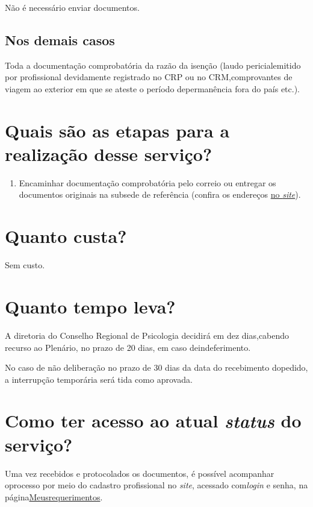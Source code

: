 Não é necessário enviar documentos.

\subsection{Nos demais casos}

Toda a documentação comprobatória da razão da isenção (laudo pericialemitido por profissional devidamente registrado no CRP ou no CRM,comprovantes de viagem ao exterior em que se ateste o período depermanência fora do país etc.).

\section{Quais são as etapas para a realização desse serviço?}

\begin{enumerate}
  \item  Encaminhar documentação comprobatória pelo correio ou entregar os  documentos originais na subsede de referência (confira os endereços  \href{https://www.crpsp.org/sede/index}{no \emph{site}}).
\end{enumerate}

\section{Quanto custa?}

Sem custo.

\section{Quanto tempo leva?}

A diretoria do Conselho Regional de Psicologia decidirá em dez dias,cabendo recurso ao Plenário, no prazo de 20 dias, em caso deindeferimento.

No caso de não deliberação no prazo de 30 dias da data do recebimento dopedido, a interrupção temporária será tida como aprovada.

\section{Como ter acesso ao atual \emph{status} do serviço?}

Uma vez recebidos e protocolados os documentos, é possível acompanhar oprocesso por meio do cadastro profissional no \emph{site}, acessado com\emph{login} e senha, na página\href{https://cfpsp.brctotal.com/crp06_servicosonline/pgsRequerimento/Requerimentos.aspx}{Meusrequerimentos}.

